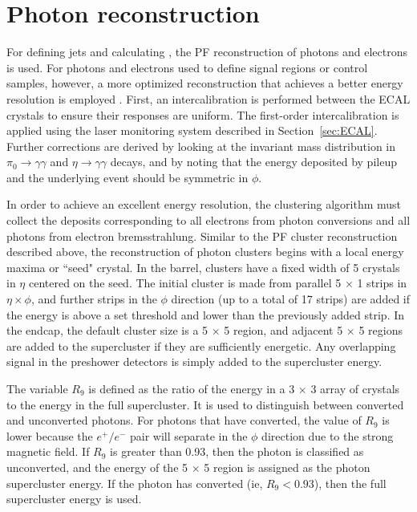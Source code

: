 \section{Photon reconstruction}
\label{sec:phoReco}
For defining jets and calculating \ETmiss, the PF reconstruction of photons and electrons is used. 
For photons and electrons used to define signal regions or control samples, however, a more optimized reconstruction that achieves a better energy resolution is employed \cite{phoPerf8TeV,elePerf8TeV}. First, an intercalibration is performed between the ECAL crystals to ensure their responses are uniform. The first-order intercalibration is applied using the laser monitoring system described in Section~\ref{sec:ECAL}. Further corrections are derived by looking at the invariant mass distribution in $\pi_0 \rightarrow \gamma\gamma$ and $\eta \rightarrow \gamma\gamma$ decays, and by noting that the energy deposited by pileup and the underlying event should be symmetric in $\phi$.

In order to achieve an excellent energy resolution, the clustering algorithm must collect the deposits corresponding to all electrons from photon conversions and all photons from electron bremsstrahlung. Similar to the PF cluster reconstruction described above, the reconstruction of photon clusters begins with a local energy maxima or ``seed" crystal. In the barrel, clusters have a fixed width of 5 crystals in $\eta$ centered on the seed. The initial cluster is made from parallel 5 $\times$ 1 strips in $\eta \times \phi$, and further strips in the $\phi$ direction (up to a total of 17 strips) are added if the energy is above a set threshold and lower than the previously added strip. In the endcap, the default cluster size is a 5 $\times$ 5 region, and adjacent 5 $\times$ 5 regions are added to the supercluster if they are sufficiently energetic. Any overlapping signal in the preshower detectors is simply added to the supercluster energy.

The variable $R_9$ is defined as the ratio of the energy in a 3 $\times$ 3 array of crystals to the energy in the full supercluster. It is used to distinguish between converted and unconverted photons. For photons that have converted, the value of $R_9$ is lower because the $e^+/e^-$ pair will separate in the $\phi$ direction due to the strong magnetic field. If $R_9$ is greater than 0.93, then the photon is classified as unconverted, and the energy of the 5 $\times$ 5 region is assigned as the photon supercluster energy. If the photon has converted (ie, $R_9 < 0.93$), then the full supercluster energy is used. 

